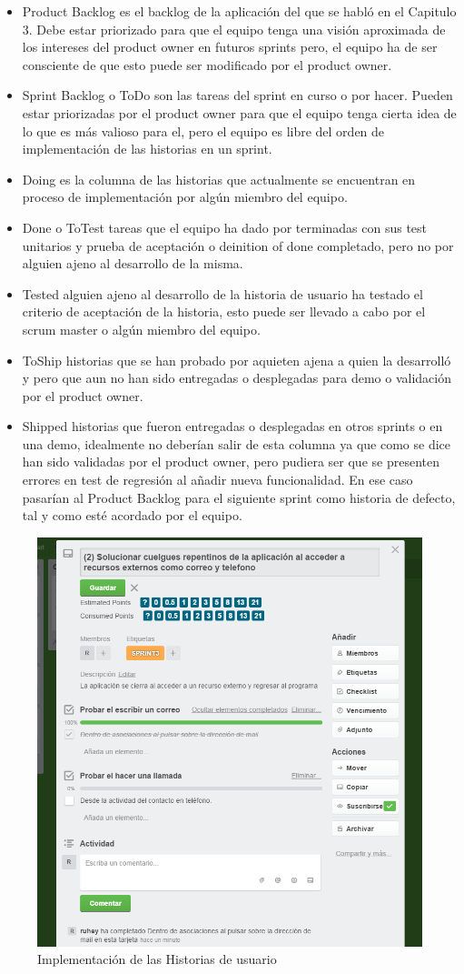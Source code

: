 \documentclass[../pfc.tex]{subfiles}
\begin{document}
	\begin{itemize} 
		\item Product Backlog es el backlog de la aplicación del que se habló en el Capitulo 3. Debe estar priorizado para que el equipo tenga una visión aproximada de los intereses del product owner en futuros sprints pero, el equipo ha de ser consciente de que esto puede ser modificado por el product owner.
		\item Sprint Backlog o ToDo son las tareas del sprint en curso o por hacer. Pueden estar priorizadas por el product owner para que el equipo tenga cierta idea de lo que es más valioso para el, pero el equipo es libre del orden de implementación de las historias en un sprint. 
		\item Doing es la columna de las historias que actualmente se encuentran en proceso de implementación por algún miembro del equipo.
		\item Done o ToTest tareas que el equipo ha dado por terminadas con sus test unitarios y prueba de aceptación o deinition of done completado, pero no por alguien ajeno al desarrollo de la misma. 
		\item Tested alguien ajeno al desarrollo de la historia de usuario ha testado el criterio de aceptación de la historia, esto puede ser  llevado a cabo por el scrum master o algún miembro del equipo. 
		\item ToShip historias que se han probado por aquieten ajena a quien la desarrolló y pero que aun no han sido entregadas o desplegadas para demo o validación por el product owner.
		\item Shipped historias que fueron entregadas o desplegadas en otros sprints o en una demo, idealmente no deberían salir de esta columna ya que como se dice han sido validadas por el product owner, pero pudiera ser que se presenten errores en test de regresión al añadir nueva funcionalidad. En ese caso pasarían al Product Backlog para el siguiente sprint como historia de defecto, tal y como esté acordado por el equipo.
	\end{itemize}
	
		\begin{figure}[H]
			\centering
			\includegraphics[width=0.7\linewidth]{../images/tarea}
			\caption{Implementación de las Historias de usuario}
			\label{fig:tareaTrello}
		\end{figure}
		
\end{document}
